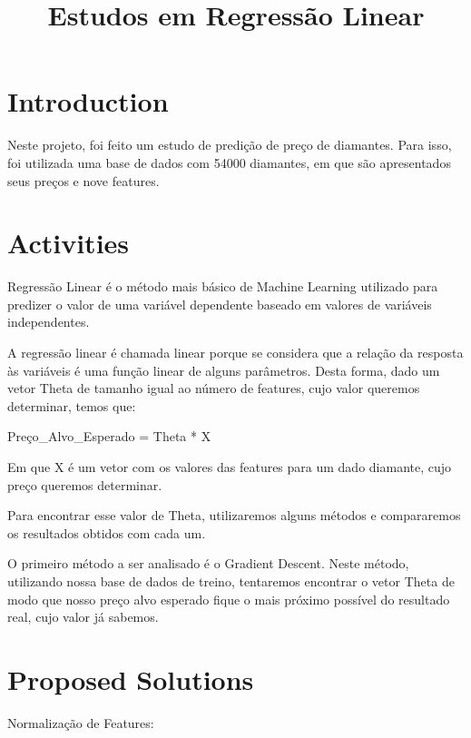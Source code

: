 \documentclass[conference]{IEEEtran}
\begin{document}
\title{Estudos em Regressão Linear}

\author{
\and
{}
}

\maketitle

\section{Introduction}

Neste projeto, foi feito um estudo de predição de preço de diamantes. Para isso, foi utilizada uma base de dados com 54000 diamantes, em que são apresentados seus preços e nove features.

\section{Activities}

Regressão Linear é o método mais básico de Machine Learning utilizado para predizer o valor de uma variável dependente baseado em valores de variáveis independentes.

A regressão linear é chamada linear porque se considera que a relação da resposta às variáveis é uma função linear de alguns parâmetros.
Desta forma, dado um vetor Theta de tamanho igual ao número de features, cujo valor queremos determinar, temos que:

Preço_Alvo_Esperado = Theta * X

Em que X é um vetor com os valores das features para um dado diamante, cujo preço queremos determinar.

Para encontrar esse valor de Theta, utilizaremos alguns métodos e compararemos os resultados obtidos com cada um.

O primeiro método a ser analisado é o Gradient Descent. Neste método, utilizando nossa base de dados de treino, tentaremos encontrar o vetor Theta de modo que nosso preço alvo esperado fique o mais próximo possível do resultado real, cujo valor já sabemos.


\section{Proposed Solutions}
Normalização de Features:
\end{document}
